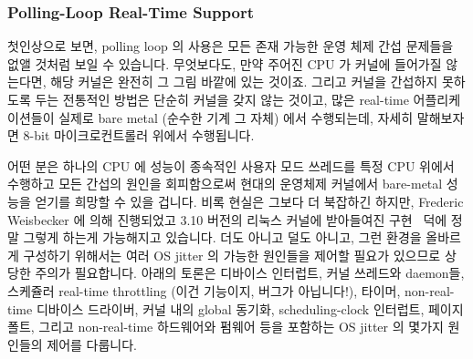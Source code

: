 \subsubsection{Polling-Loop Real-Time Support}
\label{sec:advsync:Polling-Loop Real-Time Support}

첫인상으로 보면, polling loop 의 사용은 모든 존재 가능한 운영 체제 간섭
문제들을 없앨 것처럼 보일 수 있습니다.
무엇보다도, 만약 주어진 CPU 가 커널에 들어가질 않는다면, 해당 커널은 완전히 그
그림 바깥에 있는 것이죠.
그리고 커널을 간섭하지 못하도록 두는 전통적인 방법은 단순히 커널을 갖지 않는
것이고, 많은 real-time 어플리케이션들이 실제로 bare metal (순수한 기계 그 자체)
에서 수행되는데, 자세히 말해보자면 8-bit 마이크로컨트롤러 위에서 수행됩니다.

어떤 분은 하나의 CPU 에 성능이 종속적인 사용자 모드 쓰레드를 특정 CPU 위에서
수행하고 모든 간섭의 원인을 회피함으로써 현대의 운영체제 커널에서 bare-metal
성능을 얻기를 희망할 수 있을 겁니다.
비록 현실은 그보다 더 북잡하긴 하지만, Frederic Weisbecker 에 의해 진행되었고
3.10 버전의 리눅스 커널에 받아들여진 
구현~\cite{JonCorbet2013NO-HZ-FULL} 덕에 정말 그렇게 하는게 가능해지고
있습니다.
더도 아니고 덜도 아니고, 그런 환경을 올바르게 구성하기 위해서는 여러 OS jitter
의 가능한 원인들을 제어할 필요가 있으므로 상당한 주의가 필요합니다.
아래의 토론은 디바이스 인터럽트, 커널 쓰레드와 daemon들, 스케쥴러 real-time
throttling (이건 기능이지, 버그가 아닙니다!), 타이머, non-real-time 디바이스
드라이버, 커널 내의 global 동기화, scheduling-clock 인터럽트, 페이지 폴트,
그리고 non-real-time 하드웨어와 펌웨어 등을 포함하는 OS jitter 의 몇가지
원인들의 제어를 다룹니다. 

